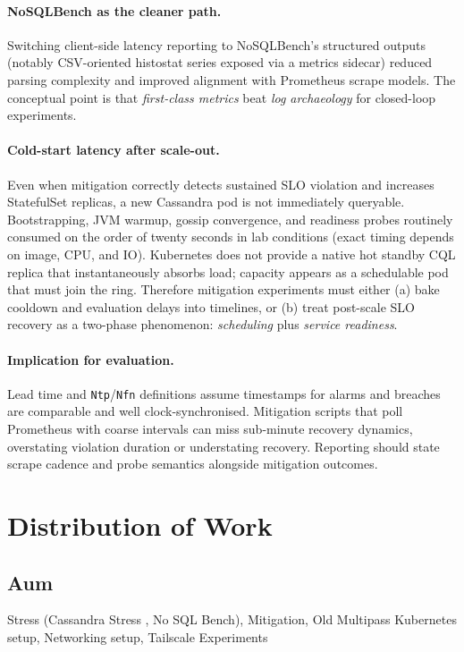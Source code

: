 \documentclass[sigconf]{acmart}
\begin{document}
\paragraph{NoSQLBench as the cleaner path.}
Switching client-side latency reporting to NoSQLBench's structured outputs (notably CSV-oriented histostat series exposed via a metrics sidecar) reduced parsing complexity and improved alignment with Prometheus scrape models. The conceptual point is that \emph{first-class metrics} beat \emph{log archaeology} for closed-loop experiments.

\paragraph{Cold-start latency after scale-out.}
Even when mitigation correctly detects sustained SLO violation and increases StatefulSet replicas, a new Cassandra pod is not immediately queryable. Bootstrapping, JVM warmup, gossip convergence, and readiness probes routinely consumed on the order of twenty seconds in lab conditions (exact timing depends on image, CPU, and IO). Kubernetes does not provide a native hot standby CQL replica that instantaneously absorbs load; capacity appears as a schedulable pod that must join the ring. Therefore mitigation experiments must either (a) bake cooldown and evaluation delays into timelines, or (b) treat post-scale SLO recovery as a two-phase phenomenon: \emph{scheduling} plus \emph{service readiness}.

\paragraph{Implication for evaluation.}
Lead time and \texttt{Ntp}/\texttt{Nfn} definitions assume timestamps for alarms and breaches are comparable and well clock-synchronised. Mitigation scripts that poll Prometheus with coarse intervals can miss sub-minute recovery dynamics, overstating violation duration or understating recovery. Reporting should state scrape cadence and probe semantics alongside mitigation outcomes.

%

\section{Distribution of Work}
\subsection{Aum}
Stress (Cassandra Stress , No SQL Bench), Mitigation, Old Multipass Kubernetes setup, Networking setup, Tailscale Experiments
\end{document}
